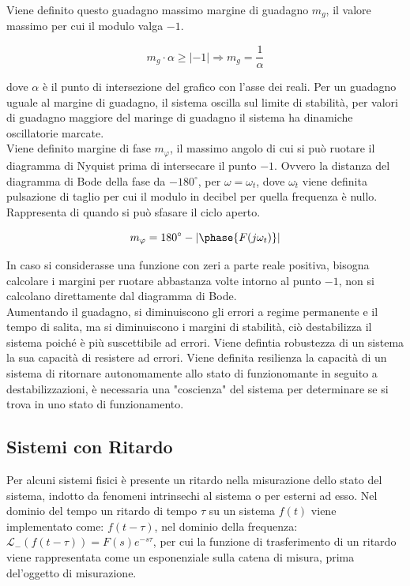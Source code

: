 \documentclass{article}
\numberwithin{equation}{subsection}
\begin{document}
Viene definito questo guadagno massimo margine di guadagno $m_g$, il valore massimo per cui il modulo valga $-1$. 

\begin{equation}
    m_g\cdot\alpha\geq|-1|\Rightarrow m_g=\displaystyle\frac{1}{\alpha}
\end{equation}

dove $\alpha$ è il punto di intersezione del grafico con l'asse dei reali. Per un guadagno uguale al margine di guadagno, il sistema oscilla sul limite di stabilità, 
per valori di guadagno maggiore del maringe di guadagno il sistema ha dinamiche oscillatorie marcate. \\

Viene definito margine di fase $m_{\varphi}$, il massimo angolo di cui si può ruotare il diagramma di Nyquist prima di intersecare il punto $-1$. Ovvero la distanza del diagramma di Bode 
della fase da $-180^{\circ}$, per $\omega=\omega_t$, dove $\omega_t$ viene definita pulsazione di taglio per cui il modulo in decibel per quella frequenza è nullo. Rappresenta 
di quando si può sfasare il ciclo aperto. 

\begin{equation}
    m_{\varphi}=180^{\circ}-|\phase{F(j\omega_t)}|
\end{equation}


In caso si considerasse una funzione con zeri a parte reale positiva, bisogna calcolare i margini per ruotare abbastanza volte intorno al punto $-1$, non si calcolano 
direttamente dal diagramma di Bode. \\

Aumentando il guadagno, si diminuiscono gli errori a regime permanente e il tempo di salita, ma si diminuiscono i margini di stabilità, ciò destabilizza il sistema poiché è 
più suscettibile ad errori. Viene defintia robustezza di un sistema la sua capacità di resistere ad errori. Viene definita resilienza la capacità di un sistema di ritornare 
autonomamente allo stato di funzionomante in seguito a destabilizzazioni, è necessaria una "coscienza" del sistema per determinare se si trova in uno stato di funzionamento. \\

\subsection{Sistemi con Ritardo}

Per alcuni sistemi fisici è presente un ritardo nella misurazione dello stato del sistema, indotto da fenomeni intrinsechi al sistema o per esterni ad esso. 
Nel dominio del tempo un ritardo di tempo $\tau$ su un sistema $f(t)$ viene implementato come: $f(t-\tau)$, nel dominio della frequenza: 
$\mathscr{L}_-(f(t-\tau))=F(s)e^{-s\tau}$, per cui la funzione di trasferimento di un ritardo viene rappresentata come un esponenziale sulla catena di misura, prima del'oggetto 
di misurazione. 
\end{document}
